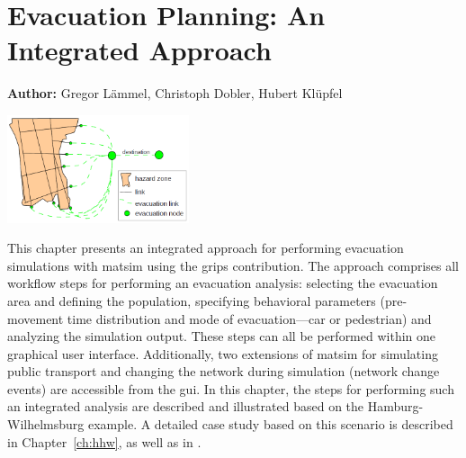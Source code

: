 \chapter{Evacuation Planning: An Integrated Approach}
\label{ch:evacuation}

\hfill \textbf{Author:} Gregor Lämmel, Christoph Dobler, Hubert Klüpfel 

\begin{center} \includegraphics[width=0.4\textwidth, angle=0]{extending/figures/Evacuation/evacuation} \end{center}



This chapter presents an integrated approach for performing evacuation simulations with \gls{matsim} using the \gls{grips} contribution. %
The approach comprises all workflow steps for performing an evacuation analysis: \ie selecting the evacuation area and defining the population, specifying  behavioral parameters (\ie  pre-movement time distribution and mode of evacuation---car or pedestrian) and analyzing the simulation output. These steps can all be performed within one graphical user interface. Additionally, two extensions of \gls{matsim} for simulating public transport and changing the network during simulation (\ie network change events) are accessible from the \gls{gui}. In this chapter, the steps for performing such an integrated analysis are described and illustrated based on the Hamburg-Wilhelmsburg example. A detailed case study based on this scenario is described in Chapter~\ref{ch:hhw}, as well as in \citet{00DurstAtAl2012PEDGRIPSAppl,Hugenbusch2012Bachelor}.

